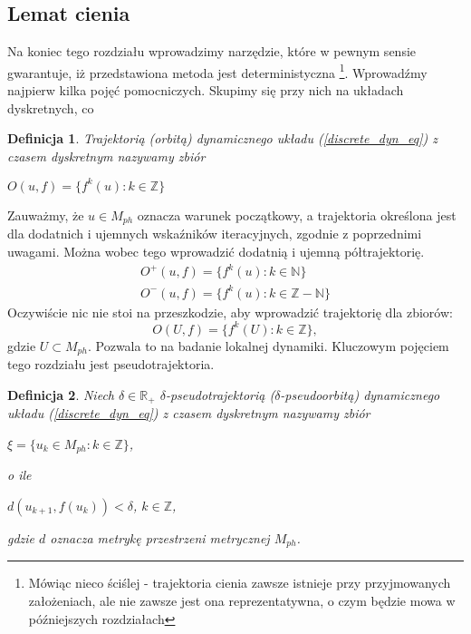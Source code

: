 \documentclass[12pt]{article}
\newtheorem{defi}{Definicja}
\begin{document}
\subsection{Lemat cienia}
Na koniec tego rozdziału wprowadzimy narzędzie, które w pewnym sensie gwarantuje, iż przedstawiona metoda jest deterministyczna \footnote{Mówiąc nieco ściślej - trajektoria cienia zawsze istnieje przy przyjmowanych założeniach, ale nie zawsze jest ona reprezentatywna, o czym będzie mowa w późniejszych rozdziałach}. Wprowadźmy najpierw kilka pojęć pomocniczych. Skupimy się przy nich na układach dyskretnych, co 
\begin{defi}\label{trajectory_discrete}
	Trajektorią (orbitą) dynamicznego układu (\ref{discrete_dyn_eq}) z czasem dyskretnym nazywamy zbiór
	\begin{center}
		$ O(u,f) = \{f^k(u): k \in \mathbb{Z}\} $
	\end{center} 
\end{defi}
Zauważmy, że $ u \in M_{ph} $ oznacza warunek początkowy, a trajektoria określona jest dla dodatnich i ujemnych wskaźników iteracyjnych, zgodnie z poprzednimi uwagami. Można wobec tego wprowadzić dodatnią i ujemną półtrajektorię.
\begin{equation}
\begin{array}{rcl} 
	O^{+}(u,f) = \{f^k(u): k \in \mathbb{N}\} \\
	O^{-}(u,f) = \{f^k(u): k \in \mathbb{Z} - \mathbb{N}\}
\end{array}
\end{equation}
Oczywiście nic nie stoi na przeszkodzie, aby wprowadzić trajektorię dla zbiorów:
\begin{equation}
	O(U,f) = \{f^k(U): k \in \mathbb{Z}\},
\end{equation}
gdzie $ U \subset M_{ph} $. Pozwala to na badanie lokalnej dynamiki. \newline
Kluczowym pojęciem tego rozdziału jest pseudotrajektoria.
\begin{defi}\label{pseudotrajectory}
	Niech $\delta \in \mathbb{R}_{+}$
	$\delta$-pseudotrajektorią ($ \delta $-pseudoorbitą) dynamicznego układu (\ref{discrete_dyn_eq}) z czasem dyskretnym nazywamy zbiór
	\begin{center}
		$ \xi = \{u_{k} \in M_{ph}: k\in \mathbb{Z}\}$,
	\end{center} 
	o ile
	\begin{center}
		$ d(u_{k+1},f(u_k))<\delta $, $ k \in \mathbb{Z} $,
	\end{center} 
	gdzie $ d $ oznacza metrykę przestrzeni metrycznej $ M_{ph} $.
\end{defi}
\end{document}
